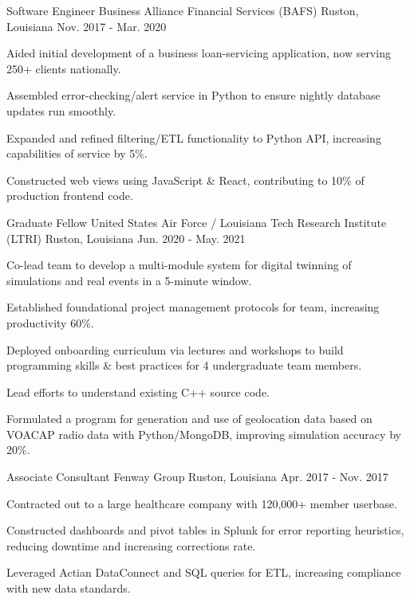 \begin{cventries}
  \cventry
    {Software Engineer} %
    {Business Alliance Financial Services (BAFS)} %
    {Ruston, Louisiana} %
    {Nov. 2017 - Mar. 2020} %
    {
      \begin{cvitems}
        \item {Aided initial development of a business loan-servicing application, now serving 250+ clients nationally.}
        \item {Assembled error-checking/alert service in Python to ensure nightly database updates run smoothly.}
        \item {Expanded and refined filtering/ETL functionality to Python API, increasing capabilities of service by 5\%.}
        \item {Constructed web views using JavaScript \& React, contributing to 10\% of production frontend code.}
      \end{cvitems}
    }

  \cventry
    {Graduate Fellow} %
    {United States Air Force / Louisiana Tech Research Institute (LTRI)} %
    {Ruston, Louisiana} %
    {Jun. 2020 - May. 2021} %
    {
      \begin{cvitems} %
        \item {Co-lead team to develop a multi-module system for digital twinning of simulations and real events in a 5-minute window.}
        \item {Established foundational project management protocols for team, increasing productivity 60\%.}
        \item {Deployed onboarding curriculum via lectures and workshops to build programming skills \& best practices for 4 undergraduate team members.}
        \item {Lead efforts to understand existing C++ source code.}
        \item {Formulated a program for generation and use of geolocation data based on VOACAP radio data with Python/MongoDB, improving simulation accuracy by 20\%.}
      \end{cvitems}
    }

  \cventry
    {Associate Consultant} %
    {Fenway Group} %
    {Ruston, Louisiana} %
    {Apr. 2017 - Nov. 2017} %
    {
      \begin{cvitems} %
        \item {Contracted out to a large healthcare company with 120,000+ member userbase.}
	      \item {Constructed dashboards and pivot tables in Splunk for error reporting heuristics, reducing downtime and increasing corrections rate.}
        \item {Leveraged Actian DataConnect and SQL queries for ETL, increasing compliance with new data standards.}
      \end{cvitems}
    }
  

\end{cventries}
